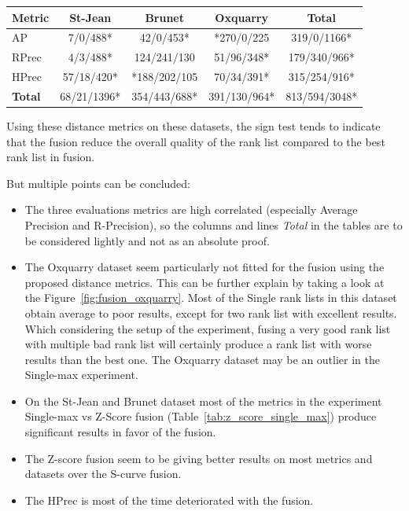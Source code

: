 \begin{table}
  \label{tab:s_curve_z_score}
  \begin{tabular}{l c c c c}
    \toprule
    Metric        & St-Jean     & Brunet       & Oxquarry     & \textbf{Total} \\ \midrule
    AP            & 7/0/488*    & 42/0/453*    & *270/0/225   & 319/0/1166*    \\
    RPrec         & 4/3/488*    & 124/241/130  & 51/96/348*   & 179/340/966*   \\
    HPrec         & 57/18/420*  & *188/202/105 & 70/34/391*   & 315/254/916*   \\
    \textbf{Total}& 68/21/1396* & 354/443/688* & 391/130/964* & 813/594/3048*  \\
    \bottomrule
  \end{tabular}
\end{table}

Using these distance metrics on these datasets, the sign test tends to indicate that the fusion reduce the overall quality of the rank list compared to the best rank list in fusion.

But multiple points can be concluded:
\begin{itemize}
  \item
  The three evaluations metrics are high correlated (especially Average Precision and R-Precision), so the columns and lines \textit{Total} in the tables are to be considered lightly and not as an absolute proof.
  \item
  The Oxquarry dataset seem particularly not fitted for the fusion using the proposed distance metrics.
  This can be further explain by taking a look at the Figure~\ref{fig:fusion_oxquarry}.
  Most of the Single rank lists in this dataset obtain average to poor results, except for two rank list with excellent results.
  Which considering the setup of the experiment, fusing a very good rank list with multiple bad rank list will certainly produce a rank list with worse results than the best one.
  The Oxquarry dataset may be an outlier in the Single-max experiment.
  \item
  On the St-Jean and Brunet dataset most of the metrics in the experiment Single-max vs Z-Score fusion (Table~\ref{tab:z_score_single_max}) produce significant results in favor of the fusion.
  \item
  The Z-score fusion seem to be giving better results on most metrics and datasets over the S-curve fusion.
  \item
  The HPrec is most of the time deteriorated with the fusion.
\end{itemize}

